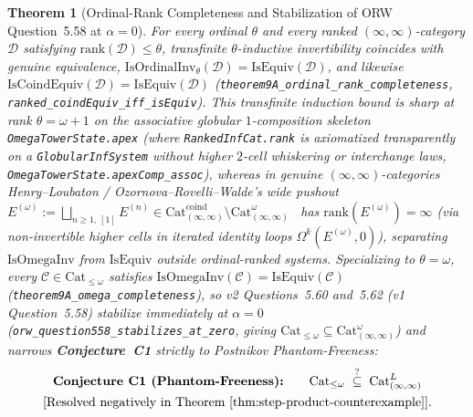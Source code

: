 \documentclass[10pt,twoside,openright]{book}
\theoremstyle{crmplain}
\newtheorem{theorem}{Theorem}[section]
\theoremstyle{crmdef}
\theoremstyle{crmremark}
\newcommand{\lean}[1]{\ignorespaces}
\newcommand{\leanwitness}{\ignorespaces}
\begin{document}
\begin{theorem}[Ordinal-Rank Completeness and Stabilization of ORW Question~5.58 at $\alpha = 0$]\label{thm:ordinal-rank-completeness}%
\lean{HomotopyCRM.isOmegaInv_iff_isOrdinalInv_omega0, HomotopyCRM.theorem9A_ordinal_rank_completeness, HomotopyCRM.ranked_coindEquiv_iff_isEquiv, HomotopyCRM.theorem9A_omega_completeness, HomotopyCRM.orw_question558_stabilizes_at_zero, HomotopyCRM.apexArrow_isOmegaInv, HomotopyCRM.apexArrow_not_isEquiv, HomotopyCRM.apexArrow_not_isCoindEquiv}%
\leanwitness%
%
For every ordinal $\theta$ and every ranked $(\infty, \infty)$-category $\mathcal{D}$ satisfying $\mathrm{rank}(\mathcal{D}) \le \theta$, transfinite $\theta$-inductive invertibility coincides with genuine equivalence, $\mathrm{IsOrdinalInv}_\theta(\mathcal{D}) = \mathrm{IsEquiv}(\mathcal{D})$, and likewise $\mathrm{IsCoindEquiv}(\mathcal{D}) = \mathrm{IsEquiv}(\mathcal{D})$ (\texttt{theorem9A\_\allowbreak ordinal\_\allowbreak rank\_\allowbreak completeness}, \texttt{ranked\_\allowbreak coindEquiv\_\allowbreak iff\_\allowbreak isEquiv}). This transfinite induction bound is sharp at rank $\theta = \omega + 1$ on the associative globular $1$-composition skeleton \texttt{OmegaTowerState.apex} (where \texttt{RankedInfCat.rank} is axiomatized transparently on a \texttt{GlobularInfSystem} without higher $2$-cell whiskering or interchange laws, \texttt{OmegaTowerState.apexComp\_\allowbreak assoc}), whereas in genuine $(\infty, \infty)$-categories Henry--Loubaton / Ozornova--Rovelli--Walde's wide pushout $E^{(\omega)} := \bigsqcup_{n \ge 1,\, [1]} E^{(n)} \in \mathrm{Cat}^{\mathrm{coind}}_{(\infty,\infty)} \setminus \mathrm{Cat}^\omega_{(\infty,\infty)}$~\cite{HenryLoubaton25,ORW26} has $\mathrm{rank}(E^{(\omega)}) = \infty$ (via non-invertible higher cells in iterated identity loops $\Omega^k(E^{(\omega)}, 0)$), separating $\mathrm{IsOmegaInv}$ from $\mathrm{IsEquiv}$ outside ordinal-ranked systems. Specializing to $\theta = \omega$, every $\mathcal{C} \in \mathrm{Cat}_{\le \omega}$ satisfies $\mathrm{IsOmegaInv}(\mathcal{C}) = \mathrm{IsEquiv}(\mathcal{C})$ (\texttt{theorem9A\_\allowbreak omega\_\allowbreak completeness}), so v2 Questions~5.60 and~5.62 (v1 Question~5.58) stabilize immediately at $\alpha = 0$ (\texttt{orw\_\allowbreak question558\_\allowbreak stabilizes\_\allowbreak at\_\allowbreak zero}, giving $\mathrm{Cat}_{\le \omega} \subseteq \mathrm{Cat}^\omega_{(\infty, \infty)}$) and narrows \textbf{Conjecture~C1} strictly to \emph{Postnikov Phantom-Freeness}:
\begin{gather*}
  \text{\textbf{Conjecture~C1 (Phantom-Freeness):}} \qquad \mathrm{Cat}_{\le \omega} \;\stackrel{?}{\subseteq}\; \mathrm{Cat}^L_{(\infty, \infty)} \\
  \text{[Resolved negatively in Theorem~\ref{thm:step-product-counterexample}].}
\end{gather*}
\end{theorem}
\end{document}
